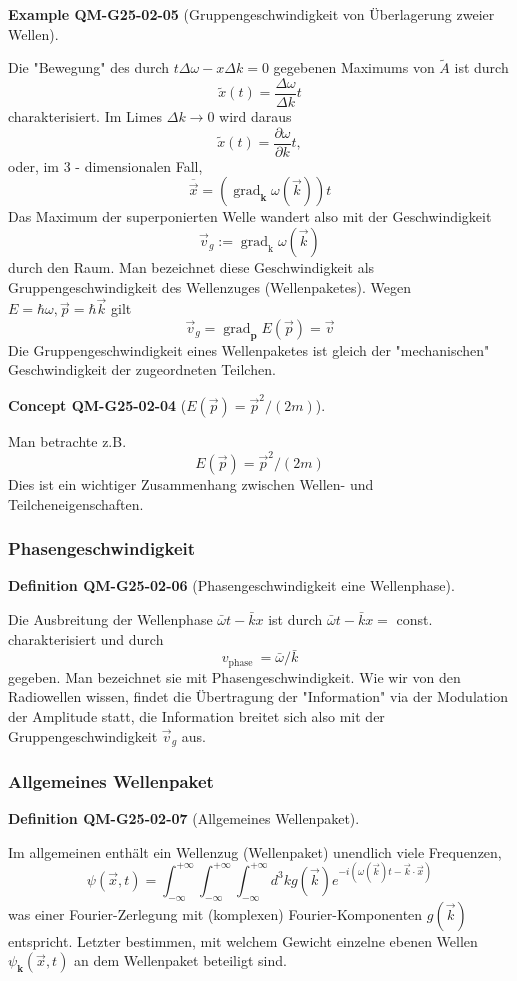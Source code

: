 \documentclass[10pt, letterpaper]{article}
\newcommand{\CustomHeading}[3]{%
  \par\medskip\noindent%
  \textbf{#1 #2} \textnormal{(#3)}.\enskip%
}
\newenvironment{DEF}[2]{\begin{unitbox}\CustomHeading{Definition}{#1}{#2}}{\end{unitbox}}
\newenvironment{EXA}[2]{\begin{unitbox}\CustomHeading{Example}{#1}{#2}}{\end{unitbox}}
\newenvironment{CONC}[2]{\begin{unitbox}\CustomHeading{Concept}{#1}{#2}}{\end{unitbox}}
\begin{document}
\begin{EXA}{QM-G25-02-05}{Gruppengeschwindigkeit von Überlagerung zweier Wellen}
Die "Bewegung" des durch $t \Delta \omega-x \Delta k=0$ gegebenen Maximums von $\tilde{A}$ ist durch
$$
\tilde{x}(t)=\frac{\Delta \omega}{\Delta k} t
$$
charakterisiert. Im Limes $\Delta k \rightarrow 0$ wird daraus
$$
\tilde{x}(t)=\frac{\partial \omega}{\partial k} t,
$$
oder, im 3 - dimensionalen Fall,
$$
\overline{\vec{x}}=\left(\operatorname{grad}_{\mathbf{k}} \omega(\vec{k})\right) t
$$
Das Maximum der superponierten Welle wandert also mit der Geschwindigkeit
$$
\vec{v}_{g}:=\operatorname{grad}_{\mathrm{k}} \omega(\vec{k})
$$
durch den Raum. Man bezeichnet diese Geschwindigkeit als Gruppengeschwindigkeit des Wellenzuges (Wellenpaketes).
Wegen $E=\hbar \omega, \vec{p}=\hbar \vec{k}$ gilt
$$
\vec{v}_{g}=\operatorname{grad}_{\mathbf{p}} E(\vec{p})=\vec{v}
$$
Die Gruppengeschwindigkeit eines Wellenpaketes ist gleich der "mechanischen" Geschwindigkeit der zugeordneten Teilchen.
\end{EXA}



\begin{CONC}{QM-G25-02-04}{$E(\vec{p})=\vec{p}^{2} /(2 m)$}
Man betrachte z.B. 
$$E(\vec{p})=\vec{p}^{2} /(2 m)$$ 
Dies ist ein wichtiger Zusammenhang zwischen Wellen- und Teilcheneigenschaften.
\end{CONC}


\subsubsection*{Phasengeschwindigkeit}


\begin{DEF}{QM-G25-02-06}{Phasengeschwindigkeit eine Wellenphase}
Die Ausbreitung der Wellenphase $\bar{\omega} t-\bar{k} x$ ist durch $\bar{\omega} t-\bar{k} x=$ const. charakterisiert und durch 
$$v_{\text {phase }}=\bar{\omega} / \bar{k}$$ 
gegeben. Man bezeichnet sie mit Phasengeschwindigkeit. Wie wir von den Radiowellen wissen, findet die Übertragung der "Information" via der Modulation der Amplitude statt, die Information breitet sich also mit der Gruppengeschwindigkeit $\vec{v}_{g}$ aus.
\end{DEF}

\subsubsection*{Allgemeines Wellenpaket}


\begin{DEF}{QM-G25-02-07}{Allgemeines Wellenpaket}
Im allgemeinen enthält ein Wellenzug (Wellenpaket) unendlich viele Frequenzen,
$$
\psi(\vec{x}, t)=\int_{-\infty}^{+\infty} \int_{-\infty}^{+\infty} \int_{-\infty}^{+\infty} d^{3} k g(\vec{k}) e^{-i(\omega(\vec{k}) t-\vec{k} \cdot \vec{x})}
$$
was einer Fourier-Zerlegung mit (komplexen) Fourier-Komponenten $g(\vec{k})$ entspricht. Letzter bestimmen, mit welchem Gewicht einzelne ebenen Wellen $\psi_{\mathbf{k}}(\vec{x}, t)$ an dem Wellenpaket beteiligt sind.
\end{DEF}
\end{document}
